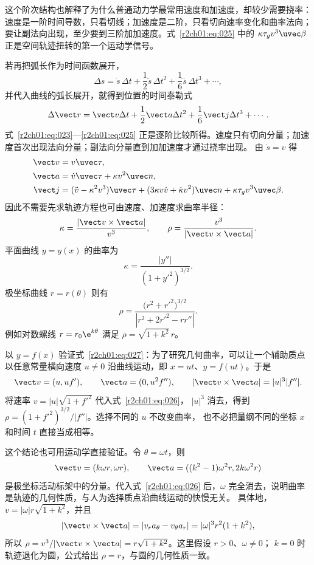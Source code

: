 这个阶次结构也解释了为什么普通动力学最常用速度和加速度，却较少需要挠率：速度是一阶时间导数，只看切线；加速度是二阶，只看切向速率变化和曲率法向；要让副法向出现，至少要到三阶加加速度。式~\eqref{r2ch01:eq:025} 中的
$\kappa\tau_gv^3\uvec\beta$ 正是空间轨迹扭转的第一个运动学信号。

若再把弧长作为时间函数展开，
\[
  \Delta s=\dot s\,\Delta t+\frac12\ddot s\,\Delta t^2
  +\frac16\dddot s\,\Delta t^3+\cdots,
\]
并代入曲线的弧长展开，就得到位置的时间泰勒式
\[
  \Delta\vect r=\vect v\Delta t+\frac12\vect a\Delta t^2
  +\frac16\vect j\Delta t^3+\cdots.
\]
式~\eqref{r2ch01:eq:023}—\eqref{r2ch01:eq:025} 正是逐阶比较所得。速度只有切向分量；加速度首次出现法向分量；副法向分量直到加加速度才通过挠率出现。
由 $\dot s=v$ 得
\begin{align}
  \vect v&=v\uvec\tau,\label{r2ch01:eq:023}\\
  \vect a&=\dot v\uvec\tau+\kappa v^2\uvec n,\label{r2ch01:eq:024}\\
  \vect j&=(\ddot v-\kappa^2v^3)\uvec\tau
  +(3\kappa v\dot v+\dot\kappa v^2)\uvec n
  +\kappa\tau_gv^3\uvec\beta.\label{r2ch01:eq:025}
\end{align}
因此不需要先求轨迹方程也可由速度、加速度求曲率半径：
\begin{equation}
  \kappa=\frac{\lvert\vect v\times\vect a\rvert}{v^3},
  \qquad
  \rho=\frac{v^3}{\lvert\vect v\times\vect a\rvert}.
  \label{r2ch01:eq:026}
\end{equation}
平面曲线 $y=y(x)$ 的曲率为
\begin{equation}
  \kappa=\frac{|y''|}{(1+y'^2)^{3/2}}.
  \label{r2ch01:eq:027}
\end{equation}
极坐标曲线 $r=r(\theta)$ 则有
\begin{equation}
  \rho=\frac{\bigl(r^2+r'^2\bigr)^{3/2}}
  {\left|r^2+2r'^2-r r''\right|}.
  \label{r2ch01:eq:028}
\end{equation}
例如对数螺线 $r=r_0\e^{k\theta}$ 满足 $\rho=\sqrt{1+k^2}\,r$。

以 $y=f(x)$ 验证式~\eqref{r2ch01:eq:027}：为了研究几何曲率，可以让一个辅助质点
以任意常量横向速度 $u\ne0$ 沿曲线运动，即 $x=ut$、$y=f(ut)$。于是
\[
 \vect v=(u,uf'),\qquad \vect a=(0,u^2f''),\qquad
 |\vect v\times\vect a|=|u|^3|f''|.
\]
将速率 $v=|u|\sqrt{1+f'^2}$ 代入式~\eqref{r2ch01:eq:026}，
$|u|^3$ 消去，得到 $\rho=(1+f'^2)^{3/2}/|f''|$。选择不同的 $u$ 不改变曲率，
也不必把量纲不同的坐标 $x$ 和时间 $t$ 直接当成相等。

这个结论也可用运动学直接验证。令 $\theta=\omega t$，则
\[
  \vect v=(k\omega r,\omega r),\qquad
  \vect a=((k^2-1)\omega^2r,2k\omega^2r)
\]
是极坐标活动标架中的分量。代入式~\eqref{r2ch01:eq:026} 后，$\omega$ 完全消去，说明曲率是轨迹的几何性质，与人为选择质点沿曲线运动的快慢无关。
具体地，$v=|\omega|r\sqrt{1+k^2}$，并且
\[
 |\vect v\times\vect a|
 =|v_ra_\theta-v_\theta a_r|
 =|\omega|^3r^2(1+k^2),
\]
所以 $\rho=v^3/|\vect v\times\vect a|=r\sqrt{1+k^2}$。这里假设 $r>0$、$\omega\ne0$；
$k=0$ 时轨迹退化为圆，公式给出 $\rho=r$，与圆的几何性质一致。

